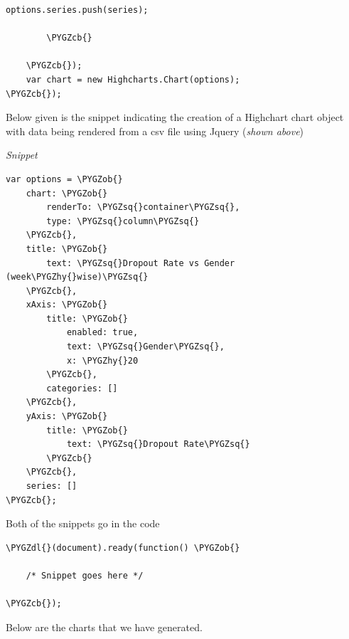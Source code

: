 \documentclass[a4paper,12pt,oneside]{sphinxmanual}
\def\PYGZob{\char`\{}
\def\PYGZcb{\char`\}}
\def\PYGZdl{\char`\$}
\def\PYGZhy{\char`\-}
\def\PYGZsq{\char`\'}
\begin{document}
\begin{itemize}
\begin{Verbatim}[commandchars=\\\{\}]
            options.series.push(series);

        \PYGZcb{}

    \PYGZcb{});
    var chart = new Highcharts.Chart(options);
\PYGZcb{});
\end{Verbatim}

Below given is the snippet indicating the creation of a Highchart chart object with data being rendered from
a csv file using Jquery (\emph{shown above})

\emph{Snippet}

\begin{Verbatim}[commandchars=\\\{\}]
var options = \PYGZob{}
    chart: \PYGZob{}
        renderTo: \PYGZsq{}container\PYGZsq{},
        type: \PYGZsq{}column\PYGZsq{}
    \PYGZcb{},
    title: \PYGZob{}
        text: \PYGZsq{}Dropout Rate vs Gender (week\PYGZhy{}wise)\PYGZsq{}
    \PYGZcb{},
    xAxis: \PYGZob{}
        title: \PYGZob{}
            enabled: true,
            text: \PYGZsq{}Gender\PYGZsq{},
            x: \PYGZhy{}20
        \PYGZcb{},
        categories: []
    \PYGZcb{},
    yAxis: \PYGZob{}
        title: \PYGZob{}
            text: \PYGZsq{}Dropout Rate\PYGZsq{}
        \PYGZcb{}
    \PYGZcb{},
    series: []
\PYGZcb{};
\end{Verbatim}

Both of the snippets go in the code

\begin{Verbatim}[commandchars=\\\{\}]
\PYGZdl{}(document).ready(function() \PYGZob{}

    /* Snippet goes here */

\PYGZcb{});
\end{Verbatim}

\end{itemize}

Below are the charts that we have generated.
\begin{figure}[htbp]
\centering

\end{figure}
\end{document}
